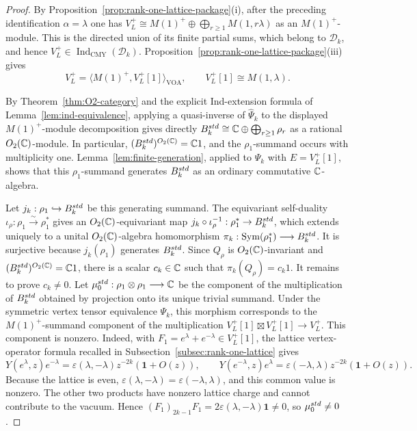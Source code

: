 \documentclass[10pt,a4paper]{amsart}
\numberwithin{equation}{section} \newtheorem{thm}{Theorem}[section] \newtheorem{lem}[thm]{Lemma} \newtheorem{ex}[thm]{Example} \newtheorem{prop}[thm]{Proposition} \newtheorem{cor}[thm]{Corollary} \newtheorem{defi}[thm]{Definition} \newtheorem{rmk}[thm]{Remark} \newtheorem{notation}[thm]{Notation}
\newcommand{\one}{\mathbf{1}}
\newcommand{\Sym}{\operatorname{Sym}}
\newcommand{\Dk}{\mathcal D_k}
\newcommand{\IndCMY}{\operatorname{Ind}_{\mathrm{CMY}}}
\newcommand{\Otwo}{O_2(\C)}
\begin{document}
\begin{proof}
By Proposition~\ref{prop:rank-one-lattice-package}(i), after the preceding identification $\alpha=\lambda$ one has \(V_L^+\cong M(1)^+\oplus\bigoplus_{r\ge1}M(1,r\lambda)\) as an $M(1)^+$-module. This is the directed union of its finite partial sums, which belong to $\Dk$, and hence $V_L^+\in\IndCMY(\Dk)$. Proposition~\ref{prop:rank-one-lattice-package}(iii) gives
\[
V_L^+=\langle M(1)^+,V_L^+[1]\rangle_{\mathrm{VOA}},\qquad V_L^+[1]\cong M(1,\lambda).
\]

By Theorem~\ref{thm:O2-category} and the explicit Ind-extension formula of Lemma~\ref{lem:ind-equivalence}, applying a quasi-inverse of $\widehat\Psi_k$ to the displayed $M(1)^+$-module decomposition gives directly \(B_k^{\rm std}\cong\C\oplus\bigoplus_{r\ge1}\rho_r\) as a rational $\Otwo$-module. In particular, \((B_k^{\rm std})^{\Otwo}=\C1\), and the $\rho_1$-summand occurs with multiplicity one. Lemma~\ref{lem:finite-generation}, applied to $\Psi_k$ with $E=V_L^+[1]$, shows that this $\rho_1$-summand generates $B_k^{\rm std}$ as an ordinary commutative $\mathbb{C}$-algebra.

Let \(j_k:\rho_1\hookrightarrow B_k^{\rm std}\) be this generating summand. The equivariant self-duality $\iota_\rho:\rho_1\overset\sim\longrightarrow\rho_1^*$ gives an $\Otwo$-equivariant map $j_k\circ\iota_\rho^{-1}:\rho_1^*\to B_k^{\rm std}$, which extends uniquely to a unital $\Otwo$-algebra homomorphism \(\pi_k:\Sym(\rho_1^*)\longrightarrow B_k^{\rm std}\). It is surjective because $j_k(\rho_1)$ generates $B_k^{\rm std}$. Since $Q_\rho$ is $\Otwo$-invariant and $(B_k^{\rm std})^{\Otwo}=\C1$, there is a scalar $c_k\in\mathbb{C}$ such that \(\pi_k(Q_\rho)=c_k1\). It remains to prove $c_k\ne0$. Let \(\mu_0^{\rm std}:\rho_1\otimes\rho_1\longrightarrow\C\) be the component of the multiplication of $B_k^{\rm std}$ obtained by projection onto its unique trivial summand. Under the symmetric vertex tensor equivalence $\Psi_k$, this morphism corresponds to the $M(1)^+$-summand component of the multiplication \(V_L^+[1]\boxtimes V_L^+[1]\longrightarrow V_L^+\). This component is nonzero. Indeed, with $F_1=e^\lambda+e^{-\lambda}\in V_L^+[1]$, the lattice vertex-operator formula recalled in Subsection~\ref{subsec:rank-one-lattice} gives
\[
Y(e^\lambda,z)e^{-\lambda}
=\varepsilon(\lambda,-\lambda)z^{-2k}(\one+O(z)),
\qquad
Y(e^{-\lambda},z)e^\lambda
=\varepsilon(-\lambda,\lambda)z^{-2k}(\one+O(z)).
\]
Because the lattice is even, $\varepsilon(\lambda,-\lambda)=\varepsilon(-\lambda,\lambda)$, and this common value is nonzero. The other two products have nonzero lattice charge and cannot contribute to the vacuum. Hence \((F_1)_{2k-1}F_1=2\varepsilon(\lambda,-\lambda)\one\ne0\), so $\mu_0^{\rm std}\ne0$.


\end{proof}
\end{document}
